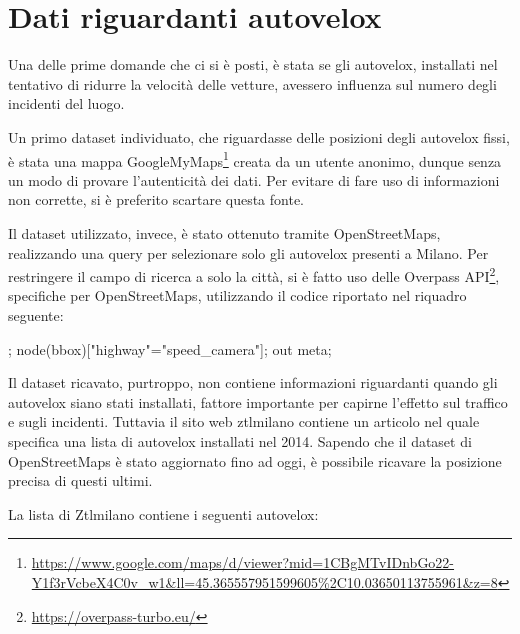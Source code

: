 \documentclass[a4paper,12pt]{report}
\begin{document}
\section{Dati riguardanti autovelox}

Una delle prime domande che ci si è posti, è stata se gli autovelox, installati 
nel tentativo di ridurre la velocità delle vetture, avessero influenza sul numero 
degli incidenti del luogo.

Un primo dataset individuato, che riguardasse delle posizioni 
degli autovelox fissi, è stata una mappa 
GoogleMyMaps\footnote{\url{https://www.google.com/maps/d/viewer?mid=1CBgMTvIDnbGo22-Y1f3rVcbeX4C0v_w1&ll=45.365557951599605\%2C10.03650113755961&z=8}} 
creata da un utente anonimo, dunque senza un modo di provare l'autenticità dei dati. 
Per evitare di fare uso di informazioni non corrette, si è preferito scartare 
questa fonte.

Il dataset utilizzato, invece, è stato ottenuto tramite OpenStreetMaps, 
realizzando una query per selezionare solo gli autovelox presenti a Milano. 
Per restringere il campo di ricerca a solo la città, si è fatto uso delle 
Overpass API\footnote{\url{https://overpass-turbo.eu/}}, 
specifiche per OpenStreetMaps, utilizzando il codice riportato nel riquadro seguente: 

\begin{code}
;
node({{bbox}})["highway"="speed_camera"];
out meta;
\end{code}

Il dataset ricavato, purtroppo, non contiene informazioni riguardanti quando gli 
autovelox siano stati installati, fattore importante per capirne l'effetto 
sul traffico e sugli incidenti.
Tuttavia il sito web ztlmilano \cite{ZTLMILANO:1}
contiene un articolo nel quale specifica una lista di 
autovelox installati nel 2014. 
Sapendo che il dataset di OpenStreetMaps è stato aggiornato fino ad oggi, 
è possibile ricavare la posizione precisa di questi ultimi.

La lista di Ztlmilano contiene i seguenti autovelox: 
\end{document}
